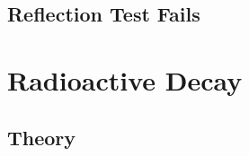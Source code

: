\subsection{\label{ssec:RTF}Reflection Test Fails}  %

\section{Radioactive Decay}  %

\subsection{Theory}  %

